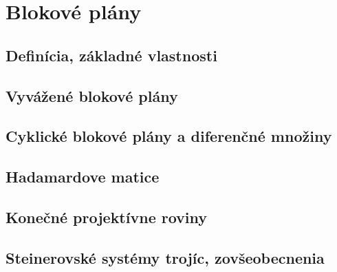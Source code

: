 \chapter{Blokové plány}

\section{Definícia, základné vlastnosti}
\section{Vyvážené blokové plány}
\section{Cyklické blokové plány a diferenčné množiny}
\section{Hadamardove matice}
\section{Konečné projektívne roviny}
\section{Steinerovské systémy trojíc, zovšeobecnenia}
